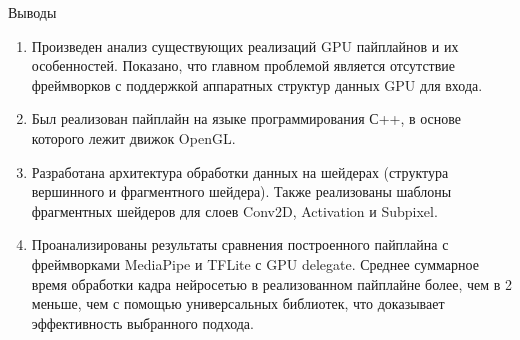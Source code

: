 \documentclass[aspectratio=169,xcolor=dvipsnames]{beamer}
\begin{document}
\begin{frame}{Выводы}
    \begin{enumerate}
        \item Произведен анализ существующих реализаций GPU пайплайнов и их особенностей. Показано, что главном проблемой является отсутствие фреймворков с поддержкой аппаратных структур данных GPU для входа.
        \item Был реализован пайплайн на языке программирования С++, в основе которого лежит движок OpenGL.
        \item Разработана архитектура обработки данных на шейдерах (структура вершинного и фрагментного шейдера). Также реализованы шаблоны фрагментных шейдеров для слоев Conv2D, Activation и Subpixel.
        \item Проанализированы результаты сравнения построенного пайплайна с фреймворками MediaPipe и TFLite с GPU delegate. Среднее суммарное время обработки кадра нейросетью в реализованном пайплайне более, чем в 2 меньше, чем с помощью универсальных библиотек, что доказывает эффективность выбранного подхода.
    \end{enumerate}
\end{frame}

\end{document}

